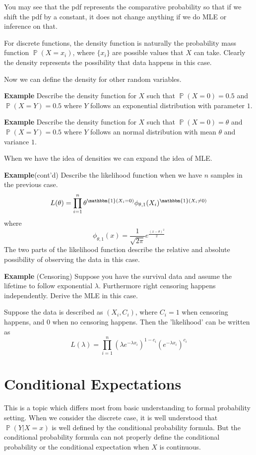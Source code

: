 \documentclass[12pt]{article}
\newcommand{\1}{\mathbbm{1}}
\renewcommand{\P}{\operatorname{\mathbb{P}}}
\begin{document}
You may see that the pdf represents the comparative probability so that if we shift the pdf by a constant, it does not change anything if we do MLE or inference on that. 

For discrete functions, the density function is naturally the probability mass function $\P (X = x_i)$, where $\{x_i\}$ are possible values that $X$ can take. Clearly the density represents the possibility that data happens in this case.

Now we can define the density for other random variables. 

\textbf{Example} Describe the density function for $X$ such that $\P(X = 0) =0.5$ and $\P(X = Y) = 0.5$ where $Y$ follows an exponential distribution with parameter $1$.

\textbf{Example} Describe the density function for $X$ such that $\P(X = 0) =\theta $ and $\P(X = Y) = 0.5$ where $Y$ follows an normal distribution with mean $\theta$ and variance $1$.

When we have the idea of densities we can expand the idea of MLE. 

\textbf{Example}(cont'd) Describe the likelihood function when we have $n$ samples in the previous case.
$$
L(\theta) =\prod_{i=1}^n \theta^{\1(X_i = 0)} \phi_{\theta,1}(X_i)^{\1 (X_i \neq 0)}
$$
where
$$
\phi_{\theta, 1}(x) =\frac{1}{\sqrt{2\pi}} e^{\frac{(x- \theta)^2}{2}}
$$
The two parts of the likelihood function describe the relative and absolute possibility of observing the data in this case.

\textbf{Example} (Censoring) Suppose you have the survival data and assume the lifetime to follow exponential $\lambda$. Furthermore right censoring happens independently. Derive the MLE in this case.

Suppose the data is described as $(X_i,C_i)$, where $C_i = 1$ when censoring happens, and $0$ when no censoring happens. Then the 'likelihood' can be written as
$$
L(\lambda) = \prod_{i=1}^n (\lambda e^{-\lambda x_i} )^{1-c_i} (e^{-\lambda x_i} )^{c_i}
$$

\section{Conditional Expectations}

This is a topic which differs most from basic understanding to formal probability setting. When we consider the discrete case, it is well understood that $\P (Y | X =x)$ is well defined by the conditional probability formula. But the conditional probability formula can not properly define the conditional probability or the conditional expectation when $X$ is continuous.
\end{document}
